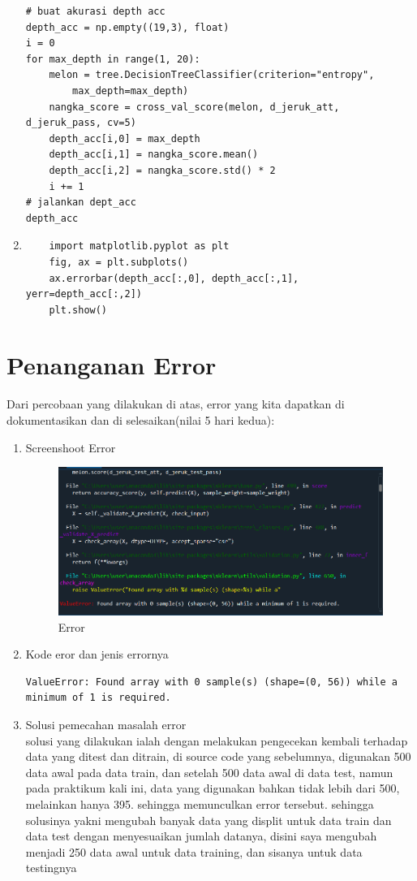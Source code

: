 \begin{enumerate}
\begin{lstlisting}
# buat akurasi depth acc
depth_acc = np.empty((19,3), float)
i = 0
for max_depth in range(1, 20):
    melon = tree.DecisionTreeClassifier(criterion="entropy", 
		max_depth=max_depth)
    nangka_score = cross_val_score(melon, d_jeruk_att, d_jeruk_pass, cv=5)
    depth_acc[i,0] = max_depth
    depth_acc[i,1] = nangka_score.mean()
    depth_acc[i,2] = nangka_score.std() * 2
    i += 1
# jalankan dept_acc
depth_acc
\end{lstlisting}
\item 
\begin{lstlisting}
	import matplotlib.pyplot as plt
	fig, ax = plt.subplots()
	ax.errorbar(depth_acc[:,0], depth_acc[:,1], yerr=depth_acc[:,2])
	plt.show()
\end{lstlisting}
\end{enumerate}


\section{Penanganan Error}
Dari percobaan yang dilakukan di atas, error yang kita dapatkan di dokumentasikan dan di selesaikan(nilai 5 hari kedua):
\begin{enumerate}
	\item Screenshoot Error
\begin{figure}[H]
    \centering
    \includegraphics[width=1\textwidth]{figures/Screenshot (2341).png}
    \caption{Error}
    \label{fig:my_label}
\end{figure}
	\item
Kode eror dan jenis errornya\\
\begin{lstlisting}
ValueError: Found array with 0 sample(s) (shape=(0, 56)) while a minimum of 1 is required.
\end{lstlisting}
	\item Solusi pemecahan masalah error\\
solusi yang dilakukan ialah dengan melakukan pengecekan kembali terhadap data yang ditest dan ditrain, di source code yang sebelumnya, digunakan 500 data awal pada data train, dan setelah 500 data awal di data test, namun pada praktikum kali ini, data yang digunakan bahkan tidak lebih dari 500, melainkan hanya 395. sehingga memunculkan error tersebut.
sehingga solusinya yakni mengubah banyak data yang displit untuk data train dan data test dengan menyesuaikan jumlah datanya, disini saya mengubah menjadi 250 data awal untuk data training, dan sisanya untuk data testingnya
\end{enumerate}